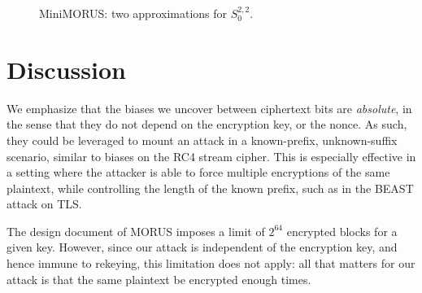 \documentclass{llncs}
\newcommand{\cipher}[1]{\textsf{#1}}
\begin{document}
\begin{figure}
  \caption{\cipher{MiniMORUS}: two approximations for $S^{2,2}_0$.}
  \label{fig:twoapproximations}
\end{figure}

\section{Discussion}


We emphasize that the biases we uncover between ciphertext bits are \emph{absolute}, in the sense that they do not depend on the encryption key, or the nonce. As such, they could be leveraged to mount an attack in a known-prefix, unknown-suffix scenario, similar to biases on the RC4 stream cipher. This is especially effective in a setting where the attacker is able to force multiple encryptions of the same plaintext, while controlling the length of the known prefix, such as in the BEAST attack on TLS.

The design document of \cipher{MORUS} imposes a limit of $2^{64}$ encrypted blocks for a given key. However, since our attack is independent of the encryption key, and hence immune to rekeying, this limitation does not apply: all that matters for our attack is that the same plaintext be encrypted enough times.
\end{document}
